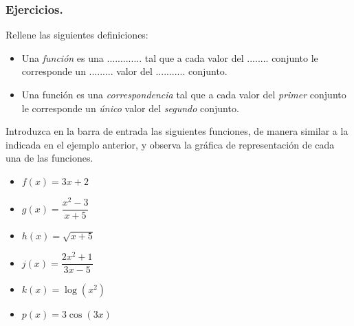 \subsubsection{Ejercicios.}
\begin{ex}
	Rellene las siguientes definiciones:
		\begin{itemize}
			\item Una \emph{función} es una ............. tal que a cada valor del ........ conjunto le corresponde un ......... valor del ........... conjunto.	
		\end{itemize}
	\begin{sol}
		\begin{itemize}
			\item Una función es una \emph{correspondencia} tal que a cada valor del \emph{primer} conjunto le corresponde un \emph{único} valor del \emph{segundo} conjunto. 
		\end{itemize}
	\end{sol}
\end{ex}

\vspace{1cm}


\begin{ex}
	Introduzca en la barra de entrada las siguientes funciones, de manera similar a la indicada en el ejemplo anterior, y observa la gráfica de representación de cada una de las funciones.
	\begin{itemize}
		\item $f(x) = 3x+2$
		\item $g(x) = \dfrac{x^2-3}{x+5}$
		\item $h(x) = \sqrt{x+5}$
		\item $j(x) = \dfrac{2x^2+1}{3x-5}$
		\item $k(x) = \log (x^2)$
		\item $p(x) = 3\cos(3x)$
	\end{itemize}
	\begin{sol}
	\end{sol}
\end{ex}

\vspace{1cm}

